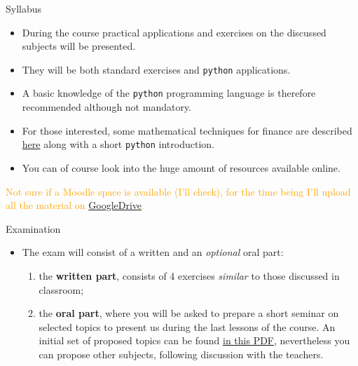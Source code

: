 \documentclass{beamer}
\begin{document}
\begin{frame}{Syllabus}
	\begin{itemize}	
		\item During the course practical applications and exercises on the discussed subjects will be presented.
		\item They will be both standard exercises and \texttt{python} applications.
		\item A basic knowledge of the \texttt{python} programming language is therefore recommended although not mandatory.
		\item For those interested, some mathematical techniques for finance are described \href{https://drive.google.com/file/d/1iKw9KOBvBwN4GXEBt0seGQ3EZutr44O0/view?usp=drive_link}{here} along with a short \texttt{python} introduction.
		\item You can of course look into the huge amount of resources available online.
	\end{itemize}
	\begin{center}
	\textcolor{orange}{Not sure if a Moodle space is available (I'll check), for the time being I'll upload all the material on \href{https://drive.google.com/drive/folders/1fVm-yim0zBlgHfISA9e6L9aryijZb84t?usp=drive_link}{GoogleDrive}.}
	\end{center}
\end{frame}

\begin{frame}{Examination}
	\begin{itemize}	
		\item The exam will consist of a written and an \emph{optional} oral part: 
		\begin{enumerate}
			\item the \textbf{written part}, consists of 4 exercises \emph{similar} to those discussed in classroom;
			\item the \textbf{oral part}, where you will be asked to prepare a short seminar on selected topics to present us during the last lessons of the course.
			An initial set of proposed topics can be found \href{https://drive.google.com/file/d/1zjOqDbDBlbtC1dPqZNUHRVFndzihTwaK/view?usp=drive_link}{in this PDF}, nevertheless you can 
			propose other subjects, following discussion with the teachers. 
		\end{enumerate} 
	\end{itemize}
\end{frame}
\end{document}
